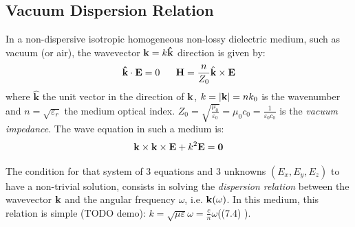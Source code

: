 \subsection{Vacuum Dispersion Relation}
In a non-dispersive isotropic homogeneous non-lossy dielectric medium, such as vacuum (or air), the wavevector ${\mathbf k}=k\mathbf{\hat{k}}$ direction is given by:
\begin{equation}
\mathbf{\hat{k}}\cdot\mathbf{E}=0
\;\;\;\;\;\;
\mathbf{H}=\frac{n}{Z_{0}}\hat{{\mathbf k}}\times\mathbf{E}\label{eq:vecteur_onde_vide}
\end{equation}
where $\mathbf{\hat{k}}$ the unit vector in the direction of ${\mathbf k}$, $k=|{\mathbf k}|=n k_{0}$ is the wavenumber and $n=\sqrt{\varepsilon_{r}}$ the medium optical index. $Z_{0}=\sqrt{\frac{\mu_{0}}{\varepsilon_{0}}}=\mu_{0}c_{0}=\frac{1}{\varepsilon_{0}c_{0}}$ is the \emph{vacuum impedance}. The wave equation in such a medium is:
\begin{equation}
{\mathbf k} \times {\mathbf k} \times \mathbf{E} + k^{2} \mathbf{E} = \mathbf{0}
\end{equation}

The condition for that system of 3 equations and 3 unknowns $(E_{x},E_{y},E_{z})$ to have a non-trivial solution, consists in solving the \emph{dispersion relation} between the wavevector ${\mathbf k}$ and the angular frequency $\omega$, i.e. ${\mathbf k}(\omega)$. In this medium, this relation is simple (TODO demo): $k=\sqrt{\mu\varepsilon}\omega=\frac{c}{n}\omega$((7.4) ).

